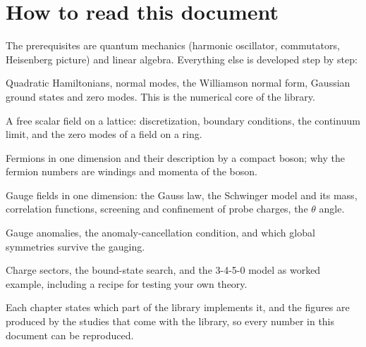 \section{How to read this document}
The prerequisites are quantum mechanics (harmonic oscillator, commutators, Heisenberg picture) and linear algebra.
Everything else is developed step by step:
\begin{description}[leftmargin=1.5em,style=nextline]
  \item[\Cref{chap:gaussian}] Quadratic Hamiltonians, normal modes, the Williamson normal form, Gaussian ground
    states and zero modes. This is the numerical core of the library.
  \item[\Cref{chap:lattice}] A free scalar field on a lattice: discretization, boundary conditions, the
    continuum limit, and the zero modes of a field on a ring.
  \item[\Cref{chap:bosonization}] Fermions in one dimension and their description by a compact boson; why the
    fermion numbers are windings and momenta of the boson.
  \item[\Cref{chap:gauge}] Gauge fields in one dimension: the Gauss law, the Schwinger model and its mass,
    correlation functions, screening and confinement of probe charges, the $\theta$ angle.
  \item[\Cref{chap:anomalies}] Gauge anomalies, the anomaly-cancellation condition, and which global symmetries
    survive the gauging.
  \item[\Cref{chap:bound}] Charge sectors, the bound-state search, and the 3-4-5-0 model as worked example,
    including a recipe for testing your own theory.
\end{description}
Each chapter states which part of the library implements it, and the figures are produced by the studies that
come with the library, so every number in this document can be reproduced.

